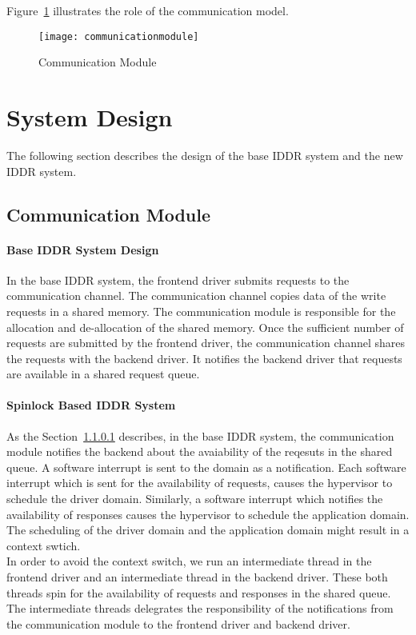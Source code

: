Figure~\ref{fig:communication} illustrates the role of the communication model. 
\begin{figure}[!ht]
\centering
\texttt{[image: communicationmodule]}
\caption{Communication Module}
\label{fig:communication}
\end{figure}

\section{System Design}\label{design}

The following section describes the design of the base IDDR system and the new IDDR system. 

\subsection{Communication Module}

\paragraph{Base IDDR System Design}
\label{par:base IDDR communication}
In the base IDDR system, the frontend driver submits requests to the communication channel. The communication channel copies data of the write requests in a shared memory. The communication module is responsible for the allocation and de-allocation of the shared memory. Once the sufficient number of requests are submitted by the frontend driver, the communication channel shares the requests with the backend driver. It notifies the backend driver that requests are available in a shared request queue.

\paragraph{Spinlock Based IDDR System}
\label{par:spin IDDR communication}
As the Section~\ref{par:base IDDR communication} describes, in the base IDDR system, the communication module notifies the backend about the avaiability of the reqesuts in the shared queue. A software interrupt is sent to the domain as a notification. Each software interrupt which is sent for the availability of requests, causes the hypervisor to schedule the driver domain. Similarly, a software interrupt which notifies the availability of responses causes the hypervisor to schedule the application domain. The scheduling of the driver domain and the application domain might result in a context swtich. 
\\[3mm]
In order to avoid the context switch, we run an intermediate thread in the frontend driver and an intermediate thread in the backend driver. These both threads spin for the availability of requests and responses in the shared queue. The intermediate threads delegrates the responsibility of the notifications from the communication module to the frontend driver and backend driver. 


